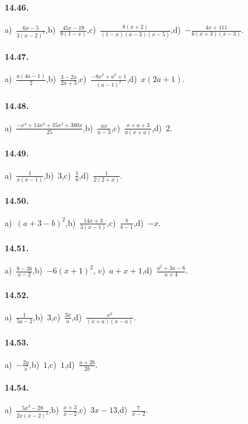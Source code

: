 \paragraph{14.46.}
a)~$\frac{6x-5}{3(x-2)^{2}}$,\quad b)~$\frac{45x-19}{9(1-x)}$,\quad c)~$\frac{8(x+2)}{(1-x)(x-3)(x-5)}$,\quad d)~$-\frac{4x+111}{6(x+3)(x-3)}$.

\paragraph{14.47.}
a)~$\frac{a(4a-1)}{2}$,\quad b)~$\frac{3-2x}{2x+3}$,\quad c)~$\frac{-8x^2+a^2+1}{(a-1)^2}$,\quad d)~$x(2a+1)$.

\paragraph{14.48.}
a)~$\frac{-x^4+14x^3+35x^2+380x}{25}$,\quad b)~$\frac{ax}{a-3}$,\quad c)~$\frac{x+a+3}{a(x+a)}$,\quad d)~$2$.

\paragraph{14.49.}
a)~$\frac{1}{x(x-1)}$,\quad b)~$3$,\quad c)~$\frac{1}{6}$,\quad d)~$\frac{1}{2(2+x)}$.

\paragraph{14.50.}
a)~$(a+3-b)^{2}$,\quad b)~$\frac{14x+3}{3(x-1)}$,\quad c)~$\frac{b}{b-1}$,\quad d)~$-x$.

\paragraph{14.51.}
a)~$\frac{8-3b}{a-2}$,\quad b)~$-6(x+1)^{2}$, \quad c)~$a+x+1$,\quad d)~$\frac{a^{2}+3a-8}{a+4}$.

\paragraph{14.52.}
a)~$\frac{1}{5a-2}$,\quad b)~$3$,\quad c)~$\frac{3x}{a}$,\quad d)~$\frac{x^{2}}{(x+a)(x-a)}$.

\paragraph{14.53.}
a)~$-\frac{2y}{x}$,\quad b)~$1$,\quad c)~$1$,\quad d)~$\frac{a+2b}{2b}$. %

\paragraph{14.54.}
a)~$\frac{5x^{3}-28}{2x(x-2)^{2}}$,\quad b)~$\frac{x+3}{x-2}$,\quad c)~$3x-13$,\quad d)~$\frac{7}{x-2}$.

